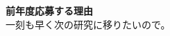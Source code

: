 \documentclass[11pt,a4j,dvipdfmx]{jarticle} 					%
\newcommand{\研究課題名}{象の卵}
\newcommand{\研究機関名}{逢坂大学}
\newcommand{\研究代表者氏名}{湯川秀樹}
\newcommand{\研究期間の最終元号年度}{13}  %
\begin{document}
\noindent
\textbf{前年度応募する理由}\\
	一刻も早く次の研究に移りたいので。








\end{document}
